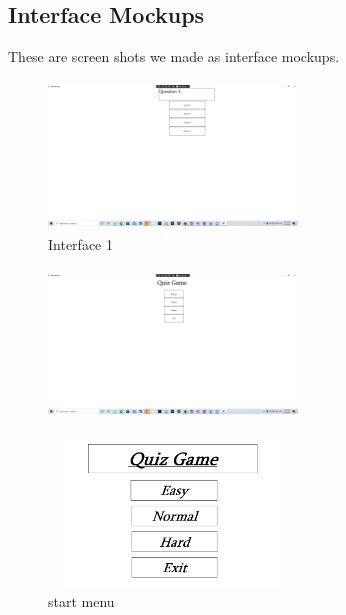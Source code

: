 \documentclass[10pt,conference,onecolumn,compsoc]{IEEEtran}
\begin{document}
\subsection{Interface Mockups}
These are screen shots we made as interface mockups.
\begin{figure}[ht!]
\includegraphics[height=150px, width=250px]{Interface1.png}
\caption{Interface 1}
\label{Interface1}
\end{figure}
\begin{figure}[ht!]
\includegraphics[height=150px, width=250px]{Interface2.png}
\caption{}
\label{Interface1}
\end{figure}
\begin{figure}[ht!]
\includegraphics[height=150px, width=250px]{interface3.png}
\caption{start menu}
\label{Interface1}
\end{figure}
\end{document}
